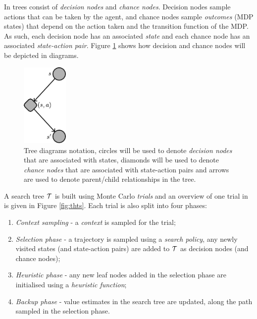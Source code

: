         In \thtspp\ewe trees consist of \textit{decision nodes} and \textit{chance nodes}. Decision nodes sample actions that can be taken by the agent, and chance nodes sample \textit{outcomes} (MDP states) that depend on the action taken and the transition function of the MDP. As such, each decision node has an associated \textit{state} and each chance node has an associated \textit{state-action pair}. Figure \ref{fig:tree_notation} shows how decision and chance nodes will be depicted in diagrams.

        \begin{figure}
            \centering\includegraphics[width=0.2\textwidth]{figures/ch2/tree_notation.pdf} 
            \caption[Tree diagrams notation.]{Tree diagrams notation, circles will be used to denote \textit{decision nodes} that are associated with states, diamonds will be used to denote \textit{chance nodes} that are associated with state-action pairs and arrows are used to denote parent/child relationships in the tree.}
            \label{fig:tree_notation}
        \end{figure}

        A search tree $\mathcal{T}$ is built using Monte Carlo \textit{trials} and an overview of one trial in \thtspp\ewe is given in Figure \ref{fig:thts}. Each \thtspp\ewe trial is also split into four phases: 
        \begin{enumerate}
            \item  
                \textit{Context sampling} - a \textit{context} is sampled for the trial;
            \item 
                \textit{Selection phase} - a trajectory is sampled using a \textit{search policy}, any newly visited states (and state-action pairs) are added to $\mathcal{T}$ as decision nodes (and chance nodes);
            \item 
                \textit{Heuristic phase} - any new leaf nodes added in the selection phase are initialised using a \textit{heuristic function}; 
            \item 
                \textit{Backup phase} - value estimates in the search tree are updated, along the path sampled in the selection phase. 
        \end{enumerate}

